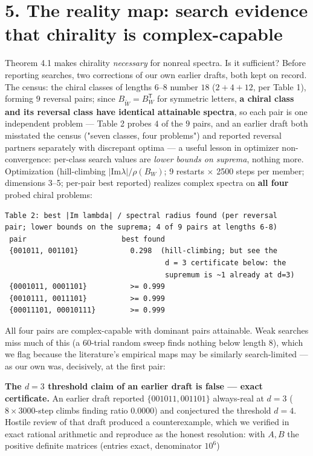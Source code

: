 \documentclass[11pt]{article}
\begin{document}
\section*{5. The reality map: search evidence that chirality is complex-capable}
Theorem 4.1 makes chirality \emph{necessary} for nonreal spectra.  Is it sufficient?  Before reporting searches, two corrections of our own earlier drafts, both kept on record.  The census: the chiral classes of lengths 6–8 number $18$ ($2 + 4 + 12$, per Table 1), forming $9$ reversal pairs; since $B_{\widetilde W} = B_W^{\mathsf T}$ for symmetric letters, \textbf{a chiral class and its reversal class have identical attainable spectra}, so each pair is one independent problem — Table 2 probes $4$ of the $9$ pairs, and an earlier draft both misstated the census ("seven classes, four problems") and reported reversal partners separately with discrepant optima — a useful lesson in optimizer non-convergence: per-class search values are \emph{lower bounds on suprema}, nothing more.  Optimization (hill-climbing $|\mathrm{Im}\lambda|/\rho(B_W)$; 9 restarts $\times$ 2500 steps per member; dimensions 3–5; per-pair best reported) realizes complex spectra on \textbf{all four} probed chiral problems:

\begin{small}\begin{verbatim}
Table 2: best |Im lambda| / spectral radius found (per reversal
pair; lower bounds on the suprema; 4 of 9 pairs at lengths 6-8)
 pair                      best found
 {001011, 001101}            0.298  (hill-climbing; but see the
                                     d = 3 certificate below: the
                                     supremum is ~1 already at d=3)
 {0001011, 0001101}          >= 0.999
 {0010111, 0011101}          >= 0.999
 {00011101, 00010111}        >= 0.999
\end{verbatim}\end{small}
All four pairs are complex-capable with dominant pairs attainable. Weak searches miss much of this (a 60-trial random sweep finds nothing below length 8), which we flag because the literature's empirical maps may be similarly search-limited — as our own was, decisively, at the first pair:

\textbf{The $d = 3$ threshold claim of an earlier draft is false — exact certificate.}  An earlier draft reported $\{001011, 001101\}$ always-real at $d = 3$ ($8\times 3000$-step climbs finding ratio $0.0000$) and conjectured the threshold $d = 4$.  Hostile review of that draft produced a counterexample, which we verified in exact rational arithmetic and reproduce as the honest resolution: with $A, B$ the positive definite matrices (entries exact, denominator $10^6$)
\end{document}
